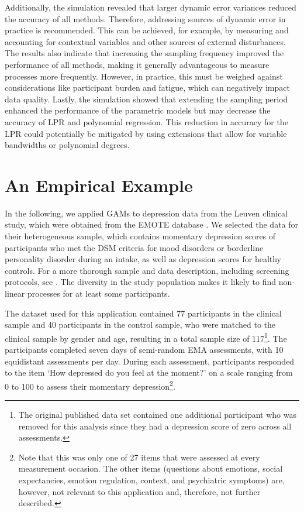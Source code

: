 \documentclass[man, floatsintext]{apa7}
\begin{document}
Additionally, the simulation revealed that larger dynamic error variances
reduced the accuracy of all methods. Therefore, addressing sources of dynamic
error in practice is recommended. This can be achieved, for example, by
measuring and accounting for contextual variables and other sources of external
disturbances. The results also indicate that increasing the sampling frequency
improved the performance of all methods, making it generally advantageous to
measure processes more frequently. However, in practice, this must be weighed
against considerations like participant burden and fatigue, which can
negatively impact data quality. Lastly, the simulation showed that extending
the sampling period enhanced the performance of the parametric models but may
decrease the accuracy of LPR and polynomial regression. This reduction in
accuracy for the LPR could potentially be mitigated by using extensions that
allow for variable bandwidths or polynomial degrees.

\section{An Empirical Example} \label{empirical_example}

In the following, we applied GAMs to depression data from the Leuven clinical
study, which were obtained from the EMOTE database
\parencite{kalokerinos_emote_nodate}. We selected the data for their
heterogeneous sample, which contains momentary depression scores of
participants who met the DSM criteria for mood disorders or borderline
personality disorder during an intake, as well as depression scores for healthy
controls. For a more thorough sample and data description, including screening
protocols, see \textcite{heininga_dynamical_2019}. The diversity in the study
population makes it likely to find non-linear processes for at least some
participants.

The dataset used for this application contained 77 participants in the clinical
sample and 40 participants in the control sample, who were matched to the
clinical sample by gender and age, resulting in a total sample size of
117\footnote{The original published data set contained one additional
  participant who was removed for this analysis since they had a depression
  score
  of zero across all assessments.}. The participants completed seven days of
semi-random EMA assessments, with 10 equidistant assessments per day. During
each assessment, participants responded to the item `How depressed do you feel
at the moment?' on a scale ranging from 0 to 100 to assess their momentary
depression\footnote{Note that this was only one of 27 items that were assessed
  at every measurement occasion. The other items (questions about emotions,
  social expectancies, emotion regulation, context, and psychiatric symptoms)
  are, however, not relevant to this application and, therefore, not further
  described.}.
\end{document}
